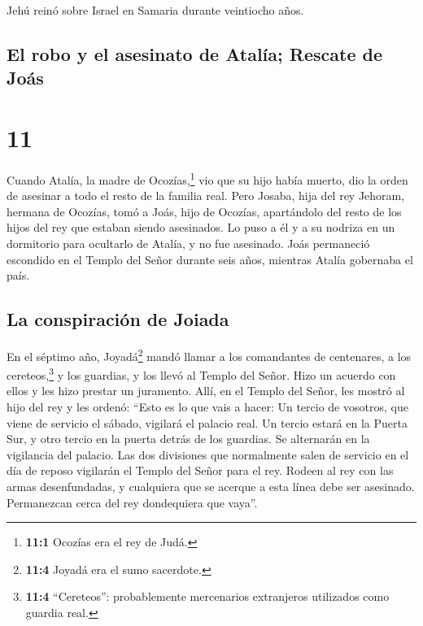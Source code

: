 Jehú reinó sobre Israel en Samaria durante veintiocho
años.

\hypertarget{el-robo-y-el-asesinato-de-ataluxeda-rescate-de-jouxe1s}{%
\subsection{El robo y el asesinato de Atalía; Rescate de
Joás}\label{el-robo-y-el-asesinato-de-ataluxeda-rescate-de-jouxe1s}}

\hypertarget{section-10}{%
\section{11}\label{section-10}}

 Cuando Atalía, la madre de Ocozías,\footnote{\textbf{11:1}
  Ocozías era el rey de Judá.} vio que su hijo había muerto, dio la
orden de asesinar a todo el resto de la familia real. 
Pero Josaba, hija del rey Jehoram, hermana de Ocozías, tomó a Joás, hijo
de Ocozías, apartándolo del resto de los hijos del rey que estaban
siendo asesinados. Lo puso a él y a su nodriza en un dormitorio para
ocultarlo de Atalía, y no fue asesinado.  Joás permaneció
escondido en el Templo del Señor durante seis años, mientras Atalía
gobernaba el país.

\hypertarget{la-conspiraciuxf3n-de-joiada}{%
\subsection{La conspiración de
Joiada}\label{la-conspiraciuxf3n-de-joiada}}

 En el séptimo año, Joyadá\footnote{\textbf{11:4} Joyadá
  era el sumo sacerdote.} mandó llamar a los comandantes de centenares,
a los cereteos,\footnote{\textbf{11:4} ``Cereteos'': probablemente
  mercenarios extranjeros utilizados como guardia real.} y los guardias,
y los llevó al Templo del Señor. Hizo un acuerdo con ellos y les hizo
prestar un juramento. Allí, en el Templo del Señor, les mostró al hijo
del rey  y les ordenó: ``Esto es lo que vais a hacer: Un
tercio de vosotros, que viene de servicio el sábado, vigilará el palacio
real.  Un tercio estará en la Puerta Sur, y otro tercio en
la puerta detrás de los guardias. Se alternarán en la vigilancia del
palacio.  Las dos divisiones que normalmente salen de
servicio en el día de reposo vigilarán el Templo del Señor para el rey.
 Rodeen al rey con las armas desenfundadas, y cualquiera
que se acerque a esta línea debe ser asesinado. Permanezcan cerca del
rey dondequiera que vaya''.

